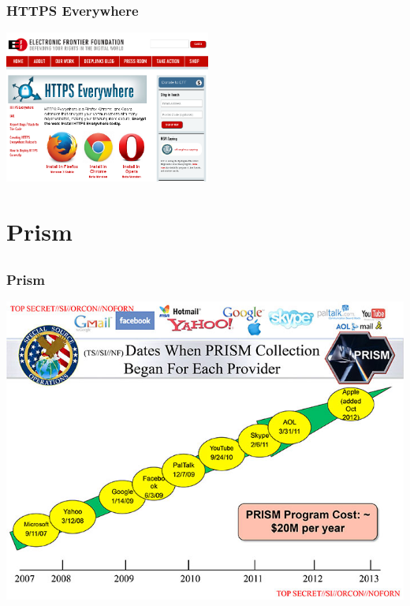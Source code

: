\documentclass[12pt]{beamer}
\begin{document}
\begin{frame}
  \frametitle{HTTPS Everywhere}
    \begin{center}
      \includegraphics[height=5cm]{img/https-everywhere.png}
    \end{center}
\end{frame}

\section{Prism}
\subsection{}

\begin{frame}
    \frametitle{Prism}
    \includegraphics[height=0.7\textheight]{img/prism.jpg}
\end{frame}
\end{document}
